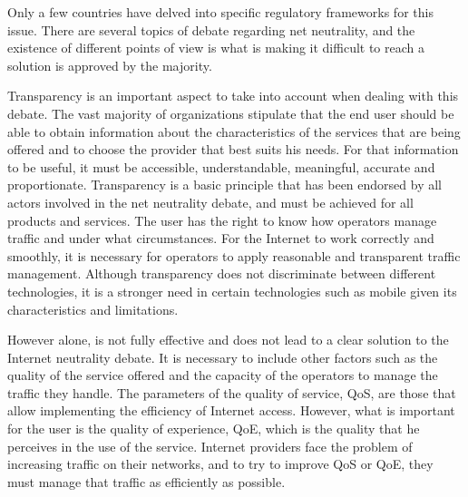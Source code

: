 \documentclass[journal]{IEEEtran}
\begin{document}
Only a few countries have delved into specific regulatory frameworks for this issue. There are several topics of debate regarding net neutrality, and the existence of different points of view is what is making it difficult to reach a solution is approved by the majority.

Transparency is an important aspect to take into account when dealing with this debate. The vast majority of organizations stipulate that the end user should be able to obtain information about the characteristics of the services that are being offered and to choose the provider that best suits his needs. For that information to be useful, it must be accessible, understandable, meaningful, accurate and proportionate. Transparency is a basic principle that has been endorsed by all actors involved in the net neutrality debate, and must be achieved for all products and services. The user has the right to know how operators manage traffic and under what circumstances. For the Internet to work correctly and smoothly, it is necessary for operators to apply reasonable and transparent traffic management. Although transparency does not discriminate between different technologies, it is a stronger need in certain technologies such as mobile given its characteristics and limitations.

However alone, is not fully effective and does not lead to a clear solution to the Internet neutrality debate. It is necessary to include other factors such as the quality of the service offered and the capacity of the operators to manage the traffic they handle. The parameters of the quality of service, QoS, are those that allow implementing the efficiency of Internet access. However, what is important for the user is the quality of experience, QoE, which is the quality that he perceives in the use of the service. Internet providers face the problem of increasing traffic on their networks, and to try to improve QoS or QoE, they must manage that traffic as efficiently as possible.
\end{document}
